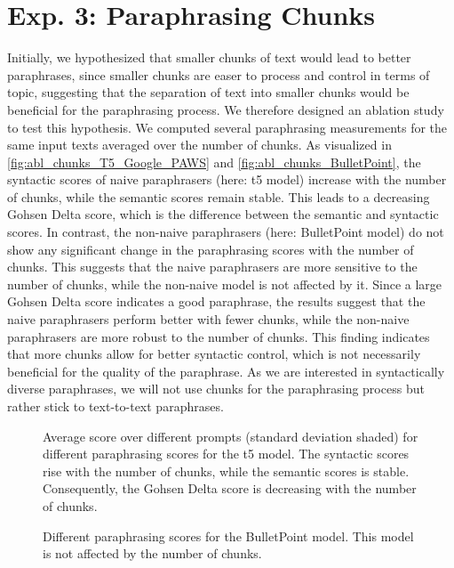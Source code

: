 \section{Exp. 3: Paraphrasing Chunks}

Initially, we hypothesized that smaller chunks of text would lead to better paraphrases, 
since smaller chunks are easer to process and control in terms of topic,
suggesting that the separation of text into smaller chunks would be beneficial for the paraphrasing process.
We therefore designed an ablation study to test this hypothesis.
We computed several paraphrasing measurements for the same input texts averaged over the number of chunks.
As visualized in \autoref{fig:abl_chunks_T5_Google_PAWS} and \autoref{fig:abl_chunks_BulletPoint},
the syntactic scores of naive paraphrasers (here: \ac{t5} model) increase with the number of chunks,
while the semantic scores remain stable.
This leads to a decreasing Gohsen Delta score, which is the difference between the semantic and syntactic scores.
In contrast, the non-naive paraphrasers (here: BulletPoint model) do not show any significant change in the paraphrasing scores with the number of chunks.
This suggests that the naive paraphrasers are more sensitive to the number of chunks, 
while the non-naive model is not affected by it.
Since a large Gohsen Delta score indicates a good paraphrase,
the results suggest that the naive paraphrasers perform better with fewer chunks, 
while the non-naive paraphrasers are more robust to the number of chunks.
This finding indicates that more chunks allow for better syntactic control, which is not necessarily beneficial for the quality of the paraphrase.
As we are interested in syntactically diverse paraphrases,
we will not use chunks for the paraphrasing process but rather stick to text-to-text paraphrases.
 
\begin{figure}[htbp]
    \centering
    
    \caption{Average score over different prompts (standard deviation shaded) for different paraphrasing scores for the \ac{t5} model.
    The syntactic scores rise with the number of chunks, while the semantic scores is stable.
    Consequently, the Gohsen Delta score is decreasing with the number of chunks.}
    \label{fig:abl_chunks_T5_Google_PAWS}
\end{figure}

\begin{figure}[htbp]
    \centering
    
    \caption{Different paraphrasing scores for the BulletPoint model. 
    This model is not affected by the number of chunks.}
    \label{fig:abl_chunks_BulletPoint}
\end{figure}

